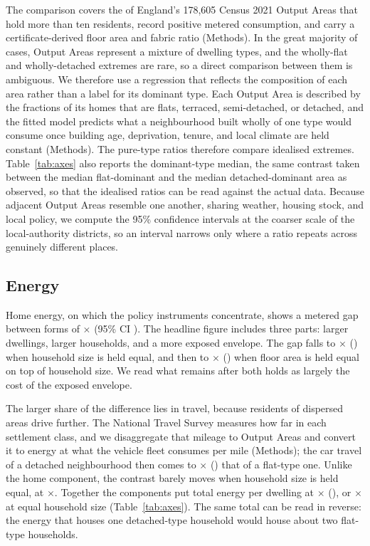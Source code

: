 \documentclass[pdflatex,sn-nature]{sn-jnl}
\begin{document}
The comparison covers the \nepisampleN{} of England's 178,605 Census 2021 Output Areas that hold more than ten residents, record positive metered consumption, and carry a certificate-derived floor area and fabric ratio (Methods). In the great majority of cases, Output Areas represent a mixture of dwelling types, and the wholly-flat and wholly-detached extremes are rare, so a direct comparison between them is ambiguous. We therefore use a regression that reflects the composition of each area rather than a label for its dominant type. Each Output Area is described by the fractions of its homes that are flats, terraced, semi-detached, or detached, and the fitted model predicts what a neighbourhood built wholly of one type would consume once building age, deprivation, tenure, and local climate are held constant (Methods). The pure-type ratios therefore compare idealised extremes. Table~\ref{tab:axes} also reports the dominant-type median, the same contrast taken between the median flat-dominant and the median detached-dominant area as observed, so that the idealised ratios can be read against the actual data. Because adjacent Output Areas resemble one another, sharing weather, housing stock, and local policy, we compute the 95\% confidence intervals at the coarser scale of the \nepiclusters{} local-authority districts, so an interval narrows only where a ratio repeats across genuinely different places.

\subsection*{Energy}

Home energy, on which the policy instruments concentrate, shows a metered gap between forms of \nepiheatGap$\times$ (95\% CI \nepiheatGapCI). The headline figure includes three parts: larger dwellings, larger households, and a more exposed envelope. The gap falls to \nepiheatFamGap$\times$ (\nepiheatFamGapCI) when household size is held equal, and then to \nepiheatSizeGap$\times$ (\nepiheatSizeGapCI) when floor area is held equal on top of household size. We read what remains after both holds as largely the cost of the exposed envelope.

The larger share of the difference lies in travel, because residents of dispersed areas drive further. The National Travel Survey measures how far in each settlement class, and we disaggregate that mileage to Output Areas and convert it to energy at what the vehicle fleet consumes per mile (Methods); the car travel of a detached neighbourhood then comes to \nepitravelGap$\times$ (\nepitravelGapCI) that of a flat-type one. Unlike the home component, the contrast barely moves when household size is held equal, at \nepitravelFamGap$\times$. Together the components put total energy per dwelling at \nepitotalGap$\times$ (\nepitotalGapCI), or \nepifamNowGap$\times$ at equal household size (Table~\ref{tab:axes}). The same total can be read in reverse: the energy that houses one detached-type household would house about two flat-type households.
\end{document}
